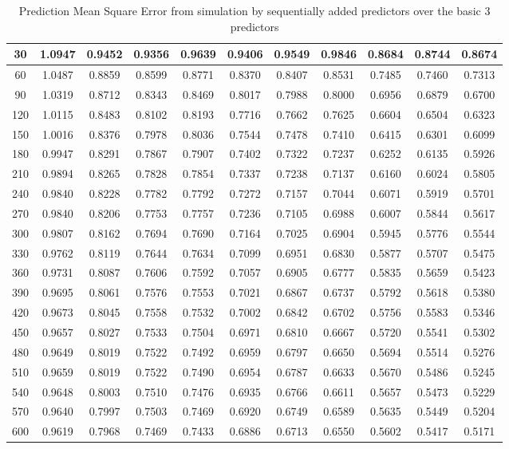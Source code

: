 \begin{table}[h!]
{\begin{tabular}{||c c c c c c c c c c c||}
30 & 1.0947 & 0.9452 & 0.9356 & 0.9639 & 0.9406 & 0.9549 & 0.9846 & 0.8684 & 0.8744 & 0.8674 \\ \hline
        60 & 1.0487 & 0.8859 & 0.8599 & 0.8771 & 0.8370 & 0.8407 & 0.8531 & 0.7485 & 0.7460 & 0.7313 \\ \hline
        90 & 1.0319 & 0.8712 & 0.8343 & 0.8469 & 0.8017 & 0.7988 & 0.8000 & 0.6956 & 0.6879 & 0.6700 \\ \hline
        120 & 1.0115 & 0.8483 & 0.8102 & 0.8193 & 0.7716 & 0.7662 & 0.7625 & 0.6604 & 0.6504 & 0.6323 \\ \hline
        150 & 1.0016 & 0.8376 & 0.7978 & 0.8036 & 0.7544 & 0.7478 & 0.7410 & 0.6415 & 0.6301 & 0.6099 \\ \hline
        180 & 0.9947 & 0.8291 & 0.7867 & 0.7907 & 0.7402 & 0.7322 & 0.7237 & 0.6252 & 0.6135 & 0.5926 \\ \hline
        210 & 0.9894 & 0.8265 & 0.7828 & 0.7854 & 0.7337 & 0.7238 & 0.7137 & 0.6160 & 0.6024 & 0.5805 \\ \hline
        240 & 0.9840 & 0.8228 & 0.7782 & 0.7792 & 0.7272 & 0.7157 & 0.7044 & 0.6071 & 0.5919 & 0.5701 \\ \hline
        270 & 0.9840 & 0.8206 & 0.7753 & 0.7757 & 0.7236 & 0.7105 & 0.6988 & 0.6007 & 0.5844 & 0.5617 \\ \hline
        300 & 0.9807 & 0.8162 & 0.7694 & 0.7690 & 0.7164 & 0.7025 & 0.6904 & 0.5945 & 0.5776 & 0.5544 \\ \hline
        330 & 0.9762 & 0.8119 & 0.7644 & 0.7634 & 0.7099 & 0.6951 & 0.6830 & 0.5877 & 0.5707 & 0.5475 \\ \hline
        360 & 0.9731 & 0.8087 & 0.7606 & 0.7592 & 0.7057 & 0.6905 & 0.6777 & 0.5835 & 0.5659 & 0.5423 \\ \hline
        390 & 0.9695 & 0.8061 & 0.7576 & 0.7553 & 0.7021 & 0.6867 & 0.6737 & 0.5792 & 0.5618 & 0.5380 \\ \hline
        420 & 0.9673 & 0.8045 & 0.7558 & 0.7532 & 0.7002 & 0.6842 & 0.6702 & 0.5756 & 0.5583 & 0.5346 \\ \hline
        450 & 0.9657 & 0.8027 & 0.7533 & 0.7504 & 0.6971 & 0.6810 & 0.6667 & 0.5720 & 0.5541 & 0.5302 \\ \hline
        480 & 0.9649 & 0.8019 & 0.7522 & 0.7492 & 0.6959 & 0.6797 & 0.6650 & 0.5694 & 0.5514 & 0.5276 \\ \hline
        510 & 0.9659 & 0.8019 & 0.7522 & 0.7490 & 0.6954 & 0.6787 & 0.6633 & 0.5670 & 0.5486 & 0.5245 \\ \hline
        540 & 0.9648 & 0.8003 & 0.7510 & 0.7476 & 0.6935 & 0.6766 & 0.6611 & 0.5657 & 0.5473 & 0.5229 \\ \hline
        570 & 0.9640 & 0.7997 & 0.7503 & 0.7469 & 0.6920 & 0.6749 & 0.6589 & 0.5635 & 0.5449 & 0.5204 \\ \hline
        600 & 0.9619 & 0.7968 & 0.7469 & 0.7433 & 0.6886 & 0.6713 & 0.6550 & 0.5602 & 0.5417 & 0.5171 \\ \hline 
\hline
\end{tabular}}
\caption{Prediction Mean Square Error from simulation by sequentially added predictors over the basic 3 predictors}
\label{table:PMSE}
\end{table}

